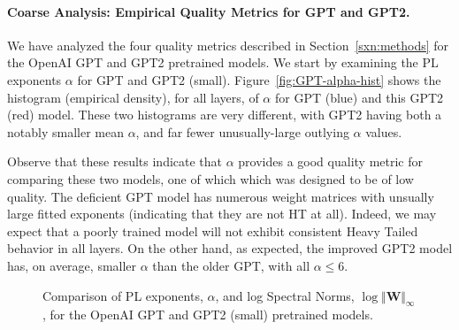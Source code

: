 \paragraph{Coarse Analysis: Empirical Quality Metrics for GPT and GPT2.}

We have analyzed the four quality metrics described in Section~\ref{sxn:methods} for the OpenAI GPT and GPT2 pretrained models.
We start by examining the PL exponents $\alpha$ for GPT and GPT2 (small).
Figure~\ref{fig:GPT-alpha-hist} shows the histogram (empirical density), for all layers, of $\alpha$ for GPT (blue) and this GPT2 (red) model.  
These two histograms are very different, with GPT2 having both a notably smaller mean $\alpha$, and far fewer unusually-large outlying $\alpha$ values.

Observe that these results indicate that $\alpha$ provides a good quality metric for comparing these two models, one of which which was designed to be of low quality.
The deficient GPT model has numerous weight matrices with unsually large fitted exponents (indicating that they are not HT at all).  
Indeed, we may expect that a poorly trained model will not exhibit consistent Heavy Tailed behavior in all layers.
On the other hand, as expected, the improved GPT2 model has, on average, smaller $\alpha$ than the older GPT, with all $\alpha\le6$.  


\begin{figure}
    \centering
   \caption{Comparison of PL exponents, $\alpha$, and log Spectral Norms, $\log\Vert\mathbf{W}\Vert_{\infty}$, for the OpenAI GPT and GPT2 (small) pretrained models.}
\label{fig:GPT-hist}
\end{figure}

